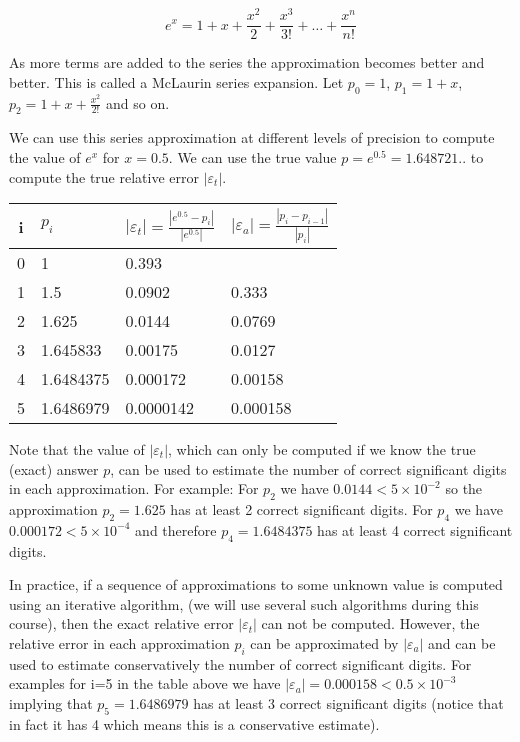 \documentclass [titlepage,12pt,letter] {article}
\begin{document}
\begin{equation} 
e^{x} = 1 + x + \frac{x^2}{2} + \frac{x^3}{3!} + \dots + \frac{x^{n}}{n!}
\end{equation} 

\noindent 
As more terms are added to the series the approximation becomes better
and better. This is called a McLaurin series expansion. Let $p_{0}
=1$, $p_{1} = 1 + x$, $p_{2} = 1 + x + \frac{x^2}{2!}$ and so on. 

We can use this series approximation at different levels of precision 
to compute the value of $e^x$ for $x = 0.5$. We can use the true value 
$p = e^{0.5} = 1.648721 ..$ to compute the true relative error
$|\varepsilon_{t}|$. 


\begin{table} 
\begin{tabular}{|c|l|l|l|} 
\hline 
i & $p_{i}$ & $|\varepsilon_{t}| = \frac{|e^{0.5} - p_{i}|}{|e^{0.5}|}$ &
$|\varepsilon_{a}| = \frac{|p_{i} - p_{i-1}|}{|p_{i}|}$ \\
\hline 
0 & 1 & 0.393 &  \\ 
1 & 1.5 & 0.0902 & 0.333 \\ 
2 & 1.625 & 0.0144 & 0.0769 \\ 
3 & 1.645833 & 0.00175 & 0.0127 \\ 
4 & 1.6484375 & 0.000172 & 0.00158 \\ 
5 & 1.6486979 & 0.0000142 & 0.000158 \\ 
\hline 


\end{tabular} 
\end{table} 


Note that the value of $|\varepsilon_t|$, which can only be computed if
we know the true (exact) answer $p$, can be used to estimate the
number of correct significant digits in each approximation. For
example: For $p_{2}$ we have $0.0144 < 5 \times 10^{-2}$ so the 
approximation $p_{2} = 1.625$ has at least 2 correct significant digits. For
$p_{4}$ we have $0.000172 < 5 \times 10^{-4}$ and therefore 
$p_{4} = 1.6484375$ has at least 4 correct significant digits. 

In practice, if a sequence of approximations to some unknown value 
is computed using an iterative algorithm, (we will use several such
algorithms during this course), then the exact relative error
$|\varepsilon_{t}|$ can not be computed. However, the relative error in
each approximation $p_i$ can be approximated by
$|\varepsilon_{a}|$ and can be used to estimate conservatively the
number of correct significant digits. For examples for i=5 in the
table above we have $|\varepsilon_{a}| = 0.000158 < 0.5 \times 10^{-3}$ 
implying that $p_{5} = 1.6486979$ has at least 3 correct significant
digits (notice that in fact it has 4 which means this is a
conservative estimate). 
\end{document}
